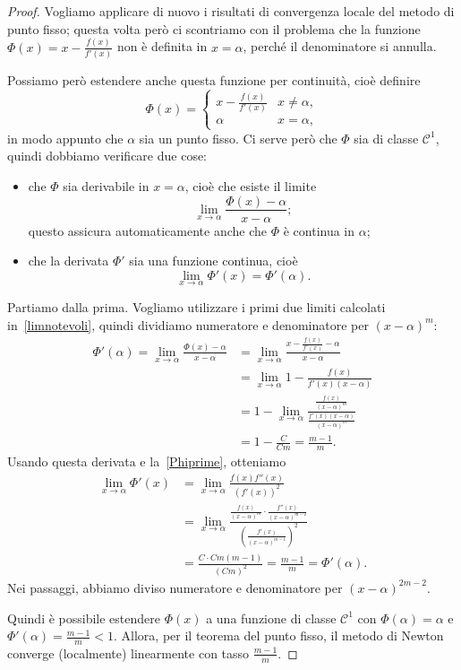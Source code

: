 \documentclass[a4paper]{report}
\theoremstyle{definiton}
\theoremstyle{remark}
\begin{document}
\begin{proof}
Vogliamo applicare di nuovo i risultati di convergenza locale del metodo di punto fisso; questa volta però ci scontriamo con il problema che la funzione $\Phi(x) = x - \frac{f(x)}{f'(x)}$ non è definita in $x=\alpha$, perché il denominatore si annulla.

Possiamo però estendere anche questa funzione per continuità, cioè definire
\[
\Phi(x) = \begin{cases}
    x - \frac{f(x)}{f'(x)} & x\neq \alpha,\\
    \alpha & x=\alpha,
\end{cases}
\]
in modo appunto che $\alpha$ sia un punto fisso. Ci serve però che $\Phi$ sia di classe $\mathcal{C}^1$, quindi dobbiamo verificare due cose:
\begin{itemize}
    \item che $\Phi$ sia derivabile in $x=\alpha$, cioè che esiste il limite
    \[
        \lim_{x\to\alpha} \frac{\Phi(x)-\alpha}{x-\alpha};
    \]
    questo assicura automaticamente anche che $\Phi$ è continua in $\alpha$;
    \item che la derivata $\Phi'$ sia una funzione continua, cioè
    \[
        \lim_{x\to\alpha} \Phi'(x) = \Phi'(\alpha).
    \]
\end{itemize}
Partiamo dalla prima. Vogliamo utilizzare i primi due limiti calcolati in~\eqref{limnotevoli}, quindi dividiamo numeratore e denominatore per $(x-\alpha)^m$:
\begin{align*}
    \Phi'(\alpha) = \lim_{x\to\alpha} \frac{\Phi(x)-\alpha}{x-\alpha} &= \lim_{x\to\alpha} \frac{x - \frac{f(x)}{f'(x)}-\alpha}{x-\alpha}\\
    &= \lim_{x\to\alpha} 1 - \frac{f(x)}{f'(x)(x-\alpha)}\\
    &= 1 - \lim_{x\to\alpha}  \frac{\frac{f(x)}{(x-\alpha)^m}}{\frac{f'(x)(x-\alpha)}{(x-\alpha)^m}}\\
    & = 1 - \frac{C}{Cm} = \frac{m-1}{m}.
\end{align*}
Usando questa derivata e la~\eqref{Phiprime}, otteniamo 
\begin{align*}
    \lim_{x\to\alpha} \Phi'(x) &= \lim_{x\to\alpha} \frac{f(x)f''(x)}{(f'(x))^2}\\
    &= \lim_{x\to\alpha} \frac{\frac{f(x)}{(x-\alpha)^m}\cdot \frac{f''(x)}{(x-\alpha)^{m-2}}}{\left(\frac{f'(x)}{(x-\alpha)^{m-1}}\right)^2}\\
    &= \frac{C \cdot Cm(m-1)}{(Cm)^2} = \frac{m-1}{m} = \Phi'(\alpha).
\end{align*}
Nei passaggi, abbiamo diviso numeratore e denominatore per $(x-\alpha)^{2m-2}$.

Quindi è possibile estendere $\Phi(x)$ a una funzione di classe $\mathcal{C}^1$ con $\Phi(\alpha)=\alpha$ e $\Phi'(\alpha) = \frac{m-1}{m} < 1$. Allora, per il teorema del punto fisso, il metodo di Newton converge (localmente) linearmente con tasso $\frac{m-1}{m}$.
\end{proof}
\end{document}
